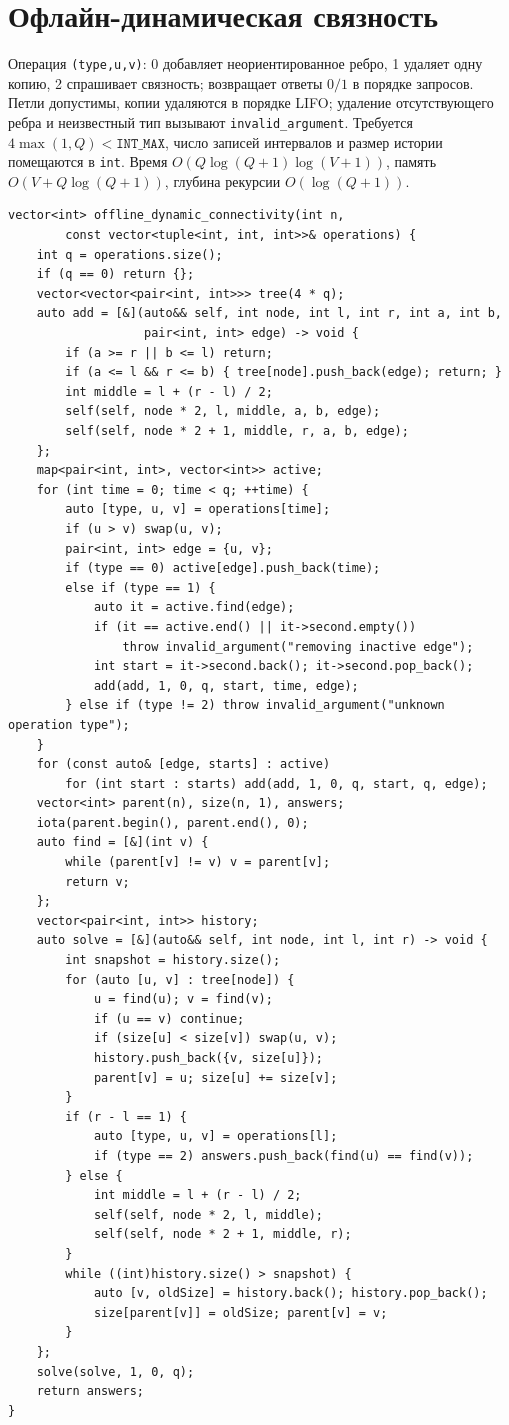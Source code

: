 \section{Офлайн-динамическая связность}
Операция \texttt{(type,u,v)}: 0 добавляет неориентированное ребро, 1 удаляет одну копию, 2 спрашивает связность; возвращает ответы $0/1$ в порядке запросов.
Петли допустимы, копии удаляются в порядке LIFO; удаление отсутствующего ребра и неизвестный тип вызывают \texttt{invalid\_argument}.
Требуется $4\max(1,Q)<\texttt{INT\_MAX}$, число записей интервалов и размер истории помещаются в \texttt{int}.
Время $O(Q\log(Q+1)\log(V+1))$, память $O(V+Q\log(Q+1))$, глубина рекурсии $O(\log(Q+1))$.
\begin{lstlisting}[name=advanced_graph_dynamic_connectivity]
vector<int> offline_dynamic_connectivity(int n,
        const vector<tuple<int, int, int>>& operations) {
    int q = operations.size();
    if (q == 0) return {};
    vector<vector<pair<int, int>>> tree(4 * q);
    auto add = [&](auto&& self, int node, int l, int r, int a, int b,
                   pair<int, int> edge) -> void {
        if (a >= r || b <= l) return;
        if (a <= l && r <= b) { tree[node].push_back(edge); return; }
        int middle = l + (r - l) / 2;
        self(self, node * 2, l, middle, a, b, edge);
        self(self, node * 2 + 1, middle, r, a, b, edge);
    };
    map<pair<int, int>, vector<int>> active;
    for (int time = 0; time < q; ++time) {
        auto [type, u, v] = operations[time];
        if (u > v) swap(u, v);
        pair<int, int> edge = {u, v};
        if (type == 0) active[edge].push_back(time);
        else if (type == 1) {
            auto it = active.find(edge);
            if (it == active.end() || it->second.empty())
                throw invalid_argument("removing inactive edge");
            int start = it->second.back(); it->second.pop_back();
            add(add, 1, 0, q, start, time, edge);
        } else if (type != 2) throw invalid_argument("unknown operation type");
    }
    for (const auto& [edge, starts] : active)
        for (int start : starts) add(add, 1, 0, q, start, q, edge);
    vector<int> parent(n), size(n, 1), answers;
    iota(parent.begin(), parent.end(), 0);
    auto find = [&](int v) {
        while (parent[v] != v) v = parent[v];
        return v;
    };
    vector<pair<int, int>> history;
    auto solve = [&](auto&& self, int node, int l, int r) -> void {
        int snapshot = history.size();
        for (auto [u, v] : tree[node]) {
            u = find(u); v = find(v);
            if (u == v) continue;
            if (size[u] < size[v]) swap(u, v);
            history.push_back({v, size[u]});
            parent[v] = u; size[u] += size[v];
        }
        if (r - l == 1) {
            auto [type, u, v] = operations[l];
            if (type == 2) answers.push_back(find(u) == find(v));
        } else {
            int middle = l + (r - l) / 2;
            self(self, node * 2, l, middle);
            self(self, node * 2 + 1, middle, r);
        }
        while ((int)history.size() > snapshot) {
            auto [v, oldSize] = history.back(); history.pop_back();
            size[parent[v]] = oldSize; parent[v] = v;
        }
    };
    solve(solve, 1, 0, q);
    return answers;
}
\end{lstlisting}
